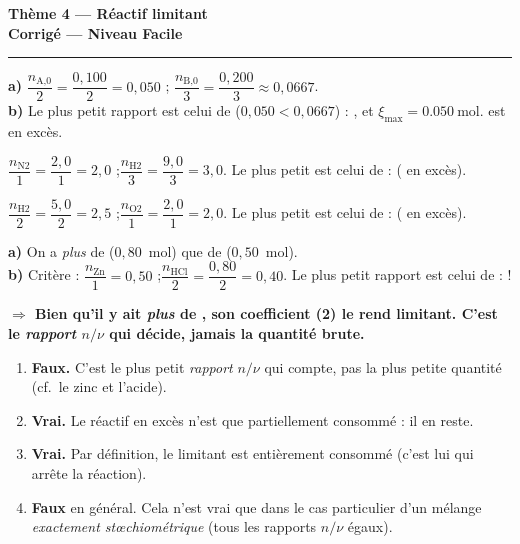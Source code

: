 \documentclass[11pt,a4paper]{article}
\newcommand{\nq}[1]{n_{\text{#1}}}
\newcommand{\rep}[1]{\par\smallskip\noindent\textbf{\color{corrcol}$\Rightarrow$ #1}}
\begin{document}
\begin{center}
{\LARGE\bfseries\color{primarydark}Thème 4 — Réactif limitant}\\[1pt]
{\large\color{corrcol}\textbf{Corrigé — Niveau Facile}}\\
{\color{primary}\rule{0.6\linewidth}{1pt}}
\end{center}

\begin{cor}
\textbf{a)} $\dfrac{\nq{A,0}}{2}=\dfrac{0{,}100}{2}=0{,}050$ ;\quad
$\dfrac{\nq{B,0}}{3}=\dfrac{0{,}200}{3}\approx0{,}0667$.\\
\textbf{b)} Le plus petit rapport est celui de  ($0{,}050<0{,}0667$) :
, et $\xi_{\max}=\SI{0,050}{\mole}$.  est en excès.
\end{cor}

\begin{cor}
$\dfrac{\nq{N2}}{1}=\dfrac{2{,}0}{1}=2{,}0$ ;\quad $\dfrac{\nq{H2}}{3}=\dfrac{9{,}0}{3}=3{,}0$.
Le plus petit est celui de  :  ( en excès).
\end{cor}

\begin{cor}
$\dfrac{\nq{H2}}{2}=\dfrac{5{,}0}{2}=2{,}5$ ;\quad $\dfrac{\nq{O2}}{1}=\dfrac{2{,}0}{1}=2{,}0$.
Le plus petit est celui de  :  ( en excès).
\end{cor}

\begin{cor}
\textbf{a)} On a \emph{plus} de  ($0{,}80$~mol) que de  ($0{,}50$~mol).\\
\textbf{b)} Critère : $\dfrac{\nq{Zn}}{1}=0{,}50$ ;\quad $\dfrac{\nq{HCl}}{2}=\dfrac{0{,}80}{2}=0{,}40$.
Le plus petit rapport est celui de  :  !
\rep{Bien qu'il y ait \emph{plus} de \ce{HCl}, son coefficient (2) le rend limitant. C'est le \emph{rapport}
$n/\nu$ qui décide, jamais la quantité brute.}
\end{cor}

\begin{cor}
\begin{enumerate}[label=\arabic*.,leftmargin=1.8em,topsep=1pt,itemsep=1pt]
  \item \textbf{Faux.} C'est le plus petit \emph{rapport} $n/\nu$ qui compte, pas la plus petite quantité
        (cf.\ le zinc et l'acide).
  \item \textbf{Vrai.} Le réactif en excès n'est que partiellement consommé : il en reste.
  \item \textbf{Vrai.} Par définition, le limitant est entièrement consommé (c'est lui qui arrête la réaction).
  \item \textbf{Faux} en général. Cela n'est vrai que dans le cas particulier d'un mélange
        \emph{exactement stœchiométrique} (tous les rapports $n/\nu$ égaux).
\end{enumerate}
\end{cor}
\end{document}

